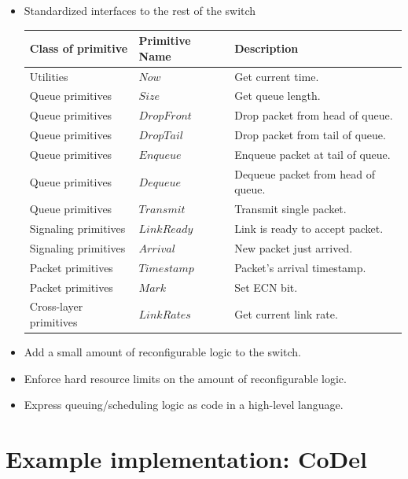 {\begin{multicols}{2}
\begin{itemize}
\item Standardized interfaces to the rest of the switch

\begin{center}

\begin{tabular}{|l|l|l|}
\hline
\bf Class of primitive & \bf Primitive Name & \bf Description \\
\hline
Utilities & $Now$ & Get current time. \\
\hline
Queue primitives & $Size$ & Get queue length. \\
\hline
Queue primitives & $DropFront$ & Drop packet from head of queue.  \\
\hline
Queue primitives & $DropTail$ & Drop packet from tail of queue. \\
\hline
Queue primitives & $Enqueue$ & Enqueue packet at tail of queue. \\
\hline
Queue primitives & $Dequeue$ & Dequeue packet from head of queue. \\
\hline
Queue primitives & $Transmit$ & Transmit single packet. \\
\hline
Signaling primitives & $LinkReady$ & Link is ready to accept packet. \\
\hline
Signaling primitives & $Arrival$ & New packet just arrived. \\
\hline
Packet primitives & $Timestamp$ & Packet's arrival timestamp. \\
\hline
Packet primitives & $Mark$ & Set ECN bit. \\
\hline
Cross-layer primitives & $LinkRates$ & Get current link rate. \\
\hline
\end{tabular}
\end{center}

\item Add a small amount of reconfigurable logic to the switch.
\item Enforce hard resource limits on the amount of reconfigurable logic.
\item Express queuing/scheduling logic as code in a high-level language.
\end{itemize}

\section*{Example implementation: CoDel}


\end{multicols}}
